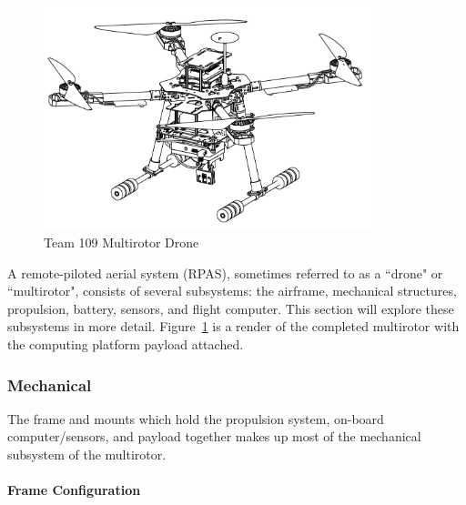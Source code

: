 \begin{figure}[H]
	\centering
	\includegraphics[width=0.85\textwidth]{img/multirotor.png}
	\caption[Team 109 Multirotor Drone]{Team 109 Multirotor Drone}
	\label{fig:drone1}
\end{figure}

A remote-piloted aerial system (RPAS), sometimes referred to as a ``drone" or ``multirotor", consists of several subsystems: the airframe, mechanical structures, propulsion, battery, sensors, and flight computer. This section will explore these subsystems in more detail. Figure~\ref{fig:drone1} is a render of the completed multirotor with the computing platform payload attached.

\subsubsection{Mechanical}\label{section:drone-mech}

The frame and mounts which hold the propulsion system, on-board computer/sensors, and payload together makes up most of the mechanical subsystem of the multirotor.

\paragraph{Frame Configuration}

